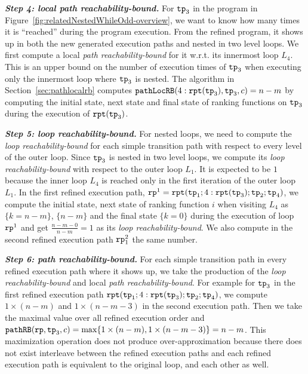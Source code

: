 \textbf{\emph{Step 4: local path reachability-bound.}}
For $\mathtt{tp}_3$ in the program in Figure~\ref{fig:relatedNestedWhileOdd-overview}, we want to know how many times it is ``reached'' during the program execution.
From the refined program, it shows up in both the new generated execution paths and nested in two level loops.
We first compute a local \emph{path reachability-bound} for it w.r.t. its innermost loop $L_4$.
This is an upper bound on the number of execution times of $\mathtt{tp}_3$ when executing only the innermost loop where $\mathtt{tp}_3$ is nested. The algorithm in Section~\ref{sec:pathlocalrb}
computes $\mathtt{pathLocRB}(4:\mathtt{rpt}(\mathtt{tp}_3), \mathtt{tp}_3, c) = n - m$ by computing
the initial state, next state and final state of ranking functions on $\mathtt{tp}_3$ during the execution of $\mathtt{rpt}(\mathtt{tp}_3)$.

\textbf{\emph{Step 5: loop reachability-bound.}}
For nested loops, we need to compute the \emph{loop reachability-bound} for each simple transition path with respect to every level of the outer loop.
Since $\mathtt{tp}_3$ is nested in two level loops, we compute its \emph{loop reachability-bound}
with respect to the outer loop $L_1$. 
It is expected to be $1$ because the inner loop $L_4$ is reached only in the first iteration of the outer loop $L_1$.
In the first refined execution path, $\mathtt{rp}^1 = \mathtt{rpt}(\mathtt{tp}_1; 4:\mathtt{rpt}(\mathtt{tp}_3); \mathtt{tp}_2; \mathtt{tp}_4)$,
we compute the initial state, next state of ranking function $i$ when visiting $L_4$
as $\{ k = n - m\}$, $\{n - m\}$ and the final state $\{k = 0\}$
during the execution of loop $\mathtt{rp}^1$ and get
$\frac{n-m - 0}{n - m} = 1$ as its \emph{loop reachability-bound}.
We also compute in the second refined execution path $\mathtt{rp}_1^2$ the same number.

\textbf{\emph{Step 6: path reachability-bound.}}
For each simple transition path in every refined execution path where it shows up, we take the production of the \emph{loop reachability-bound}
and local \emph{path reachability-bound}.
For example for $\mathtt{tp}_3$ in the first refined execution path 
$\mathtt{rpt}(\mathtt{tp}_1; 4:\mathtt{rpt}(\mathtt{tp}_3); \mathtt{tp}_2; \mathtt{tp}_4)$,
we compute $1 \times (n - m)$ and $1 \times (n - m - 3)$ in the second execution path.
Then we
take the maximal value over all refined execution order and
$\mathtt{pathRB}(\mathtt{rp}, \mathtt{tp}_3, c) = \max\{ 1 \times (n - m), 1 \times (n - m - 3) \} = n - m$.
This maximization operation does not produce over-approximation because there does not exist interleave
between the refined execution paths and each refined execution path is equivalent to the original loop, and each other as well.

